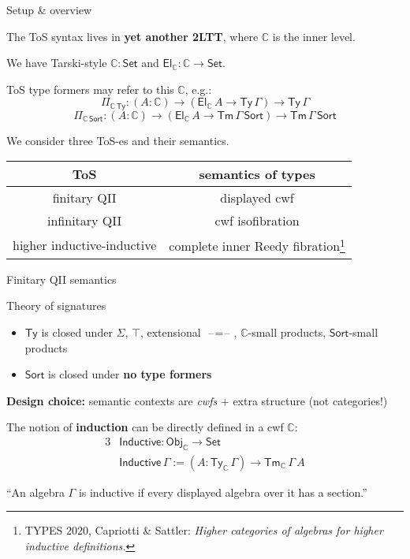 \documentclass[dvipsnames]{beamer}
\newcommand{\ms}[1]{\mathsf{#1}}
\newcommand{\mbb}[1]{\mathbb{#1}}
\newcommand{\Tm}{\mathsf{Tm}}
\newcommand{\Ty}{\mathsf{Ty}}
\newcommand{\El}{\mathsf{El}}
\newcommand{\blank}{\mathord{\hspace{1pt}\text{--}\hspace{1pt}}}
\newcommand{\Set}{\mathsf{Set}}
\newcommand{\Sort}{\mathsf{Sort}}
\newcommand{\mbbC}{\mbb{C}}
\begin{document}
\begin{frame}{Setup \& overview}

The ToS syntax lives in \textbf{yet another 2LTT}, where $\mbbC$ is
the inner level.
\vspace{1em}

We have Tarski-style $\mbbC : \Set$ and $\El_\mbbC : \mbbC \to \Set$.
\vspace{1em}

ToS type formers may refer to this $\mbbC$, e.g.:
\[ \Pi_{\mbbC\,\Ty} : (A : \mbbC) \to (\El_\mbbC\,A \to \Ty\,\Gamma) \to \Ty\,\Gamma \]
\[ \Pi_{\mbbC\,\Sort} : (A : \mbbC) \to (\El_\mbbC\,A \to \Tm\,\Gamma\,\Sort) \to \Tm\,\Gamma\,\Sort \]

We consider three ToS-es and their semantics.
\begin{center}
\begin{tabular}{|c|c|}
\hline
  \textbf{ToS} & \textbf{semantics of types} \\
\hline
  finitary QII & displayed cwf \\
\hline
  infinitary QII & cwf isofibration \\
\hline
  higher inductive-inductive & complete inner Reedy fibration\footnote{TYPES 2020, Capriotti \& Sattler: \emph{Higher categories of algebras for higher inductive definitions.}} \\
\hline
\end{tabular}
\end{center}




\end{frame}

\begin{frame}{Finitary QII semantics}

\begin{block}{Theory of signatures}
\begin{itemize}
\item $\Ty$ is closed under $\Sigma$, $\top$, extensional $\blank=\blank$, $\mbbC$-small products,
  $\Sort$-small products
\item $\Sort$ is closed under \textbf{no type formers}
\end{itemize}
\end{block}

\textbf{Design choice:} semantic contexts are \emph{cwfs} + extra structure (not categories!)
\vspace{1em}

The notion of \textbf{induction} can be directly defined in a cwf $\mbbC$:
\begin{alignat*}{3}
  & \ms{Inductive} : \ms{Obj}_\mbbC \to \Set \\
  & \ms{Inductive}\,\Gamma := (A : \Ty_\mbbC\,\Gamma) \to \Tm_\mbbC\,\Gamma\,A
\end{alignat*}

``An algebra $\Gamma$ is inductive if every displayed algebra over it has a section.''

\end{frame}
\end{document}
